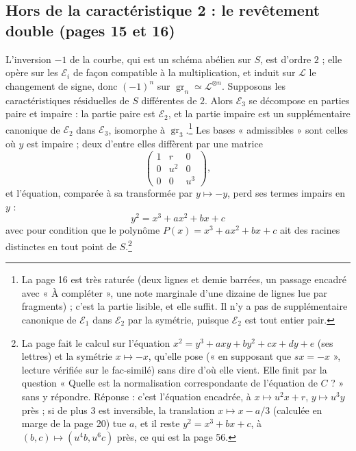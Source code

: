 \documentclass[11pt,a4paper]{article}
\begin{document}
\subsection*{Hors de la caractéristique 2 : le revêtement double (pages 15 et 16)}

L'inversion $-1$ de la courbe, qui est un schéma abélien sur $S$, est
d'ordre $2$ ; elle opère sur les $\mathcal{E}_i$ de façon compatible à la
multiplication, et induit sur $\mathcal{L}$ le changement de signe, donc $(-1)^n$
sur $\operatorname{gr}_n \simeq \mathcal{L}^{\otimes n}$. Supposons les
caractéristiques résiduelles de $S$ différentes de $2$. Alors $\mathcal{E}_3$
se décompose en parties paire et impaire : la partie paire est
$\mathcal{E}_2$, et la partie impaire est un supplémentaire canonique de
$\mathcal{E}_2$ dans $\mathcal{E}_3$, isomorphe à
$\operatorname{gr}_3$.\footnote{La page 16 est très raturée (deux lignes et
demie barrées, un passage encadré avec « À compléter », une note marginale
d'une dizaine de lignes lue par fragments) ; c'est la partie lisible, et elle
suffit. Il n'y a pas de supplémentaire canonique de $\mathcal{E}_1$ dans
$\mathcal{E}_2$ par la symétrie, puisque $\mathcal{E}_2$ est tout entier pair.}
Les bases « admissibles » sont celles où $y$ est impaire ; deux d'entre elles
diffèrent par une matrice
\[
\begin{pmatrix} 1 & r & 0 \\ 0 & u^2 & 0 \\ 0 & 0 & u^3 \end{pmatrix},
\]
et l'équation, comparée à sa transformée par $y \mapsto -y$, perd ses termes
impairs en $y$ :
\[
\boxed{\;y^2 = x^3 + ax^2 + bx + c\;}
\]
avec pour condition que le polynôme $P(x) = x^3 + ax^2 + bx + c$ ait des racines
distinctes en tout point de $S$.\footnote{La page fait le calcul sur
l'équation $x^2 = y^3 + axy + by^2 + cx + dy + e$ (ses lettres) et la symétrie
$x \mapsto -x$, qu'elle pose (« en supposant que $sx = -x$ », lecture vérifiée
sur le fac-similé) sans dire d'où elle vient. Elle finit par la
question « Quelle est la normalisation correspondante de l'équation de $C$ ? »
sans y répondre. Réponse : c'est l'équation encadrée, à $x \mapsto u^2 x + r$,
$y \mapsto u^3 y$ près ; si de plus $3$ est inversible, la translation $x
\mapsto x - a/3$ (calculée en marge de la page 20) tue $a$, et il reste $y^2 =
x^3 + bx + c$, à $(b, c) \mapsto (u^4b, u^6c)$ près, ce qui est la page 56.}
\end{document}
